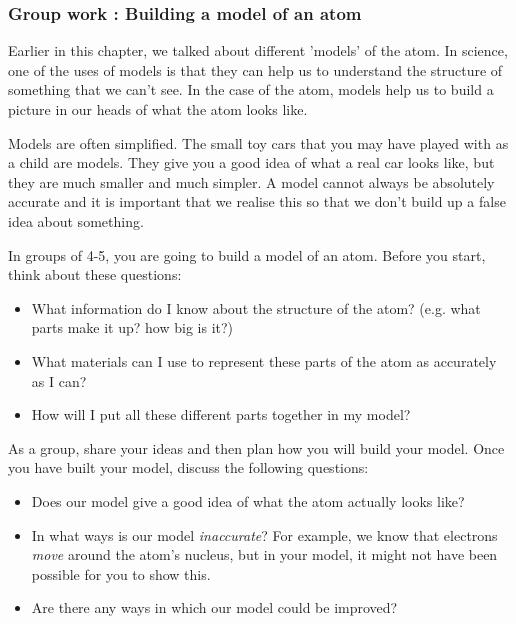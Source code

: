             \subsubsection{ Group work : Building a model of an atom         }
            \nopagebreak
            \label{m38741*id260472}Earlier in this chapter, we talked about different 'models' of the atom. In science, one of the uses of models is that they can help us to understand the structure of something that we can't see. In the case of the atom, models help us to build a picture in our heads of what the atom looks like.\par 
        \label{m38741*id260480}Models are often simplified. The small toy cars that you may have played with as a child are models. They give you a good idea of what a real car looks like, but they are much smaller and much simpler. A model cannot always be absolutely accurate and it is important that we realise this so that we don't build up a false idea about something.\par 
        \label{m38741*id260488}In groups of 4-5, you are going to build a model of an atom. Before you start, think about these questions:\par 
        \label{m38741*id260495}\begin{itemize}[noitemsep]
            \label{m38741*uid114}\item What information do I know about the structure of the atom? (e.g. what parts make it up? how big is it?)
\label{m38741*uid115}\item What materials can I use to represent these parts of the atom as accurately as I can?
\label{m38741*uid116}\item How will I put all these different parts together in my model?
\end{itemize}
        \label{m38741*id260537}As a group, share your ideas and then plan how you will build your model. Once you have built your model, discuss the following questions:\par 
        \label{m38741*id260542}\begin{itemize}[noitemsep]
            \label{m38741*uid117}\item Does our model give a good idea of what the atom actually looks like?
\label{m38741*uid118}\item In what ways is our model \textsl{inaccurate}? For example, we know that electrons \textsl{move} around the atom's nucleus, but in your model, it might not have been possible for you to show this.
\label{m38741*uid119}\item Are there any ways in which our model could be improved?
\end{itemize}
